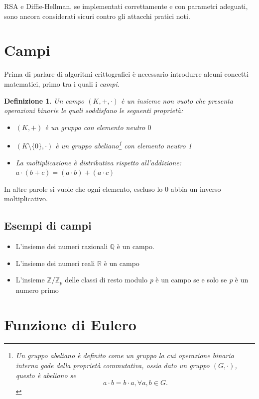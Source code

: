 \documentclass[12pt, a4paper]{report}
\newtheorem{definition}{Definizione}[section]
\begin{document}
RSA e Diffie-Hellman, se implementati correttamente e con parametri adeguati, sono ancora considerati sicuri contro gli attacchi pratici noti.

\section{Campi}
Prima di parlare di algoritmi crittografici è necessario introdurre alcuni concetti matematici, primo tra i quali i \textit{campi}.
\begin{definition}
    Un campo $(K, +, \cdot)$ è un insieme non vuoto che presenta operazioni binarie le quali soddisfano le seguenti proprietà:
    \begin{itemize}
        \item $(K, +)$ è un gruppo con elemento neutro $0$
        \item $(K \setminus \{0\}, \cdot)$ è un gruppo abeliano\footnote{Un gruppo abeliano è definito come un gruppo la cui operazione binaria interna gode della proprietà commutativa, ossia dato un gruppo $(G, \cdot)$, questo è abeliano se
        \begin{equation}
            a \cdot b = b \cdot a, \forall a, b \in G.
        \end{equation}
        } con elemento neutro 1
        \item La moltiplicazione è distributiva rispetto all'addizione: $a \cdot ( b + c ) = ( a \cdot b ) + ( a \cdot c )$
    \end{itemize}
\end{definition}

In altre parole si vuole che ogni elemento, escluso lo $0$ abbia un inverso moltiplicativo.

\subsection{Esempi di campi}
\begin{itemize}
    \item L'insieme dei numeri razionali $\mathbb{Q}$ è un campo.
    \item L'insieme dei numeri reali $\mathbb{R}$ è un campo
    \item L'insieme $\mathbb{Z} / \mathbb{Z}_p$ delle classi di resto modulo \textit{p} è un campo se e solo se \textit{p} è un numero primo
\end{itemize}

\section{Funzione di Eulero}
\end{document}
